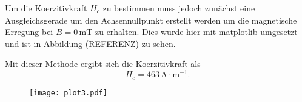 Um die Koerzitivkraft $H_c$ zu bestimmen muss jedoch
zunächst eine Ausgleichsgerade um den Achsennullpunkt
erstellt werden um die magnetische Erregung bei
$B=0\,\si{\milli\tesla}$ zu erhalten. Dies wurde hier
mit matplotlib \cite{matplotlib} umgesetzt und ist in Abbildung (REFERENZ)
zu sehen. 

Mit dieser Methode ergibt sich die Koerzitivkraft als
\begin{equation}
  H_c=463\,\si{\ampere\cdot\meter^{-1}}\nonumber.
\end{equation}

\begin{figure}
  \texttt{[image: plot3.pdf]}
\end{figure}


